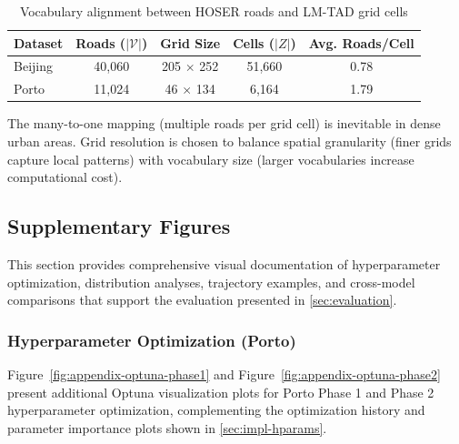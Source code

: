 \begin{table}[H]
    \centering
    \caption{Vocabulary alignment between HOSER roads and LM-TAD grid cells}
    \label{tab:vocab-alignment-appendix}
    \begin{tabular}{lcccc}
        \toprule
        \textbf{Dataset} & \textbf{Roads ($|\mathcal{V}|$)} & \textbf{Grid Size} & \textbf{Cells ($|Z|$)} & \textbf{Avg. Roads/Cell} \\
        \midrule
        Beijing          & 40,060                           & 205 $\times$ 252   & 51,660                 & 0.78                     \\
        Porto            & 11,024                           & 46 $\times$ 134    & 6,164                  & 1.79                     \\
        \bottomrule
    \end{tabular}
\end{table}

The many-to-one mapping (multiple roads per grid cell) is inevitable in dense urban areas. Grid resolution is chosen to balance spatial granularity (finer grids capture local patterns) with vocabulary size (larger vocabularies increase computational cost).

\subsection{Supplementary Figures}
\label{app:figures}

This section provides comprehensive visual documentation of hyperparameter optimization, distribution analyses, trajectory examples, and cross-model comparisons that support the evaluation presented in \autoref{sec:evaluation}.

\subsubsection{Hyperparameter Optimization (Porto)}
\label{app:optuna-porto}

Figure~\ref{fig:appendix-optuna-phase1} and Figure~\ref{fig:appendix-optuna-phase2} present additional Optuna visualization plots for Porto Phase 1 and Phase 2 hyperparameter optimization, complementing the optimization history and parameter importance plots shown in \autoref{sec:impl-hparams}.

